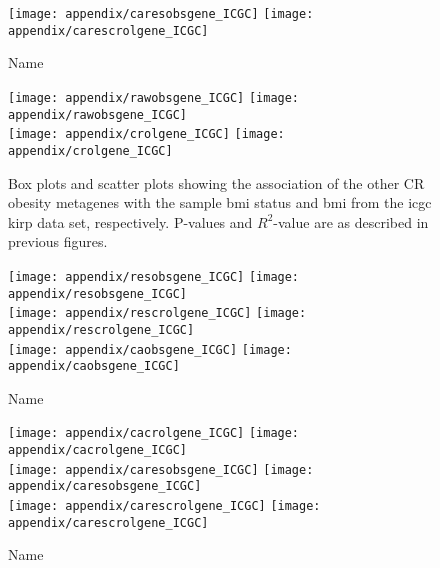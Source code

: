 \begin{appendices}
	\begin{figure}[htpb]
		\ContinuedFloat
		\captionsetup{list=off,format=cont}
		\centering
		\texttt{[image: appendix/caresobsgene\_ICGC]}
		\hfill
		\texttt{[image: appendix/carescrolgene\_ICGC]}\\
		\caption{Name}
	\end{figure}

	\begin{figure}[!htpb]
		\centering
		\texttt{[image: appendix/rawobsgene\_ICGC]}
		\hfill
		\texttt{[image: appendix/rawobsgene\_ICGC]}\\
		\texttt{[image: appendix/crolgene\_ICGC]}
		\hfill
		\texttt{[image: appendix/crolgene\_ICGC]}\\
		\caption{Box plots and scatter plots showing the association of the other CR obesity metagenes with the sample \gls{bmi} status  and \gls{bmi} from the \gls{icgc} \gls{kirp} data set, respectively.
	P-values and $R^2$-value are as described in previous figures.}
		\label{fig:appendix/cr_ob_meta_box_scatter_kirp}
	\end{figure}

	\begin{figure}[htpb]
		\ContinuedFloat
		\captionsetup{list=off,format=cont}
		\centering
		\texttt{[image: appendix/resobsgene\_ICGC]}
		\hfill
		\texttt{[image: appendix/resobsgene\_ICGC]}\\
		\texttt{[image: appendix/rescrolgene\_ICGC]}
		\hfill
		\texttt{[image: appendix/rescrolgene\_ICGC]}\\
		\texttt{[image: appendix/caobsgene\_ICGC]}
		\hfill
		\texttt{[image: appendix/caobsgene\_ICGC]}\\
		\caption{Name}
	\end{figure}

	\begin{figure}[htpb]
		\ContinuedFloat
		\captionsetup{list=off,format=cont}
		\centering
		\texttt{[image: appendix/cacrolgene\_ICGC]}
		\hfill
		\texttt{[image: appendix/cacrolgene\_ICGC]}\\
		\texttt{[image: appendix/caresobsgene\_ICGC]}
		\hfill
		\texttt{[image: appendix/caresobsgene\_ICGC]}\\
		\texttt{[image: appendix/carescrolgene\_ICGC]}
		\hfill
		\texttt{[image: appendix/carescrolgene\_ICGC]}\\
		\caption{Name}
	\end{figure}


\end{appendices}
